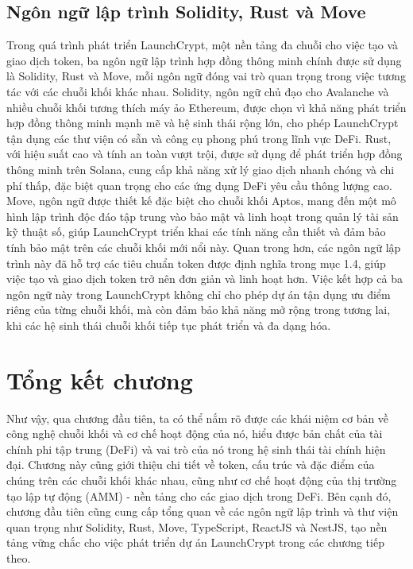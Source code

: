 \subsection{Ngôn ngữ lập trình Solidity, Rust và Move}
\hspace{1cm}Trong quá trình phát triển LaunchCrypt, một nền tảng đa chuỗi cho
việc tạo và giao dịch token, ba ngôn ngữ lập trình hợp đồng thông minh chính
được sử
dụng là Solidity, Rust và Move, mỗi ngôn ngữ đóng vai trò quan trọng trong việc
tương tác với các chuỗi khối khác nhau. Solidity, ngôn ngữ chủ đạo cho
Avalanche và nhiều chuỗi khối tương thích máy ảo Ethereum, được chọn vì khả
năng phát triển hợp đồng thông minh mạnh mẽ và hệ sinh thái rộng lớn, cho phép
LaunchCrypt tận dụng các thư viện có sẵn và công cụ phong phú trong lĩnh vực
DeFi. Rust, với hiệu suất cao và tính an toàn vượt trội, được sử dụng để phát
triển hợp đồng thông minh trên Solana, cung cấp khả năng xử lý giao dịch nhanh
chóng
và chi phí thấp, đặc biệt quan trọng cho các ứng dụng DeFi yêu cầu thông lượng
cao. Move, ngôn ngữ được thiết kế đặc biệt cho chuỗi khối Aptos, mang đến một
mô hình lập trình độc đáo tập trung vào bảo mật và linh hoạt trong quản lý tài
sản kỹ thuật số, giúp LaunchCrypt triển khai các tính năng cần thiết và đảm bảo
tính bảo mật trên các chuỗi khối mới nổi này. Quan trong hơn, các ngôn ngữ lập
trình này đã hỗ trợ các tiêu chuẩn token được định nghĩa trong mục 1.4, giúp
việc tạo và giao dịch token trở nên đơn giản và linh hoạt hơn. Việc kết hợp cả
ba ngôn ngữ này trong LaunchCrypt không chỉ cho phép dự án tận dụng ưu điểm
riêng của từng chuỗi khối, mà còn đảm bảo khả năng mở rộng trong tương lai, khi
các hệ sinh thái chuỗi khối tiếp tục phát triển và đa dạng hóa.

\section{Tổng kết chương}
Như vậy, qua chương đầu tiên, ta có thể nắm rõ được các khái niệm cơ bản về
công nghệ chuỗi khối và cơ chế hoạt động của nó, hiểu được bản chất của tài
chính phi tập
trung (DeFi) và vai trò của nó trong hệ sinh thái tài chính hiện đại. Chương
này cũng giới thiệu chi tiết về token, cấu trúc và đặc điểm của chúng trên các
chuỗi khối khác nhau, cũng như cơ chế hoạt động của thị trường tạo lập tự động
(AMM) - nền tảng cho các giao dịch trong DeFi. Bên cạnh đó, chương đầu tiên
cũng cung cấp tổng quan về các ngôn ngữ lập trình và thư viện quan trọng như
Solidity, Rust, Move, TypeScript, ReactJS và NestJS, tạo nền tảng vững chắc cho
việc phát triển dự án LaunchCrypt trong các chương tiếp theo.
